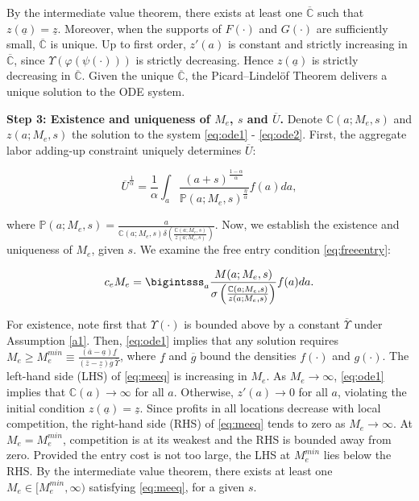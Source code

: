 By the intermediate value theorem, there exists at least one $\overline{\mathbb{C}}$ such that $z(\underline{a}) = \underline{z}$. Moreover, when the supports of $F(\cdot)$ and $G(\cdot)$ are sufficiently small, $\overline{\mathbb{C}}$ is unique. Up to first order, $z'(a)$ is constant and strictly increasing in $\overline{\mathbb{C}}$, since $\Upsilon\left(\varphi\left(\psi\left(\cdot\right)\right)\right)$ is strictly decreasing. Hence $z(\underline{a})$ is strictly decreasing in $\overline{\mathbb{C}}$. Given the unique $\overline{\mathbb{C}}$, the Picard–Lindel\"{o}f Theorem delivers a unique solution to the ODE system.  

\textbf{Step 3: Existence and uniqueness of $M_e$, $s$ and $\overline{U}$.}  
Denote $\mathbb{C}(a; M_e, s)$ and $z(a; M_e, s)$ the solution to the system \eqref{eq:ode1} - \eqref{eq:ode2}. First, the aggregate labor adding-up constraint uniquely determines $\overline{U}$:

\begin{equation*}
    \overline{U}^{\frac{1}{\alpha}} = \frac{1}{\alpha} \int_a \frac{(a + s)^{\frac{1-\alpha}{\alpha}}}{\mathbb{P}(a; M_e, s)^{\frac{\eta}{\alpha}}} f(a)da,
\end{equation*}

where $\mathbb{P}(a;M_e,s)=\frac{a}{\mathbb{C}(a;M_e,s) \delta \left(\frac{\mathbb{C}(a;M_e,s)}{z(a;M_e,s)}\right)}$. Now, we establish the existence and uniqueness of $M_e$, given $s$. We examine the free entry condition \eqref{eq:freeentry}: 

\begin{equation}\label{eq:meeq}
    c_e M_e = \bigintsss_a  \frac{M(a; M_e, s)}{\sigma\left(\frac{\mathbb{C}(a; M_e, s)}{z(a; M_e, s)}\right)} f(a) da.
\end{equation}

For existence, note first that $\Upsilon(\cdot)$ is bounded above by a constant $\overline{\Upsilon}$ under Assumption \ref{a1}. Then, \eqref{eq:ode1} implies that any solution requires $M_e \geq M_e^{min} \equiv \frac{(\overline{a} - \underline{a}) \underline{f}}{(\overline{z} - \underline{z}) \overline{g} \, \overline{\Upsilon}}$, where $\underline{f}$ and $\overline{g}$ bound the densities $f(\cdot)$ and $g(\cdot)$. The left-hand side (LHS) of \eqref{eq:meeq} is increasing in $M_e$. As $M_e \to \infty$, \eqref{eq:ode1} implies that $\mathbb{C}(a) \to \infty$ for all $a$. Otherwise, $z'(a) \to 0$ for all $a$, violating the initial condition $z(\underline{a}) = \underline{z}$. Since profits in all locations decrease with local competition, the right-hand side (RHS) of \eqref{eq:meeq} tends to zero as $M_e \to \infty$. At $M_e = M_e^{min}$, competition is at its weakest and the RHS is bounded away from zero. Provided the entry cost is not too large, the LHS at $M_e^{min}$ lies below the RHS. By the intermediate value theorem, there exists at least one $M_e \in [M_e^{min}, \infty)$ satisfying \eqref{eq:meeq}, for a given $s$.

